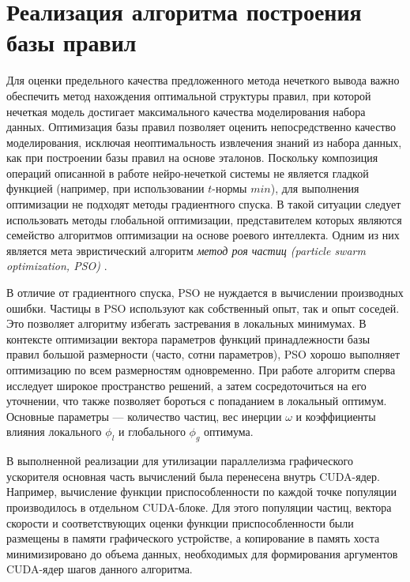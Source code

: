 
\section{Реализация алгоритма построения базы правил}

Для оценки предельного качества предложенного метода нечеткого вывода важно обеспечить метод нахождения оптимальной структуры правил, при которой нечеткая модель достигает максимального качества моделирования набора данных. Оптимизация базы правил позволяет оценить непосредственно качество моделирования, исключая неоптимальность извлечения знаний из набора данных, как при построении базы правил на основе эталонов. Поскольку композиция операций описанной в работе нейро-нечеткой системы не является гладкой функцией (например, при использовании $t$-нормы $min$), для выполнения оптимизации не подходят методы градиентного спуска. В такой ситуации следует использовать методы глобальной оптимизации, представителем которых являются семейство алгоритмов оптимизации на основе роевого интеллекта. Одним из них является мета эвристический алгоритм \textit{метод роя частиц (particle swarm optimization, PSO)} \cite{Kennedy1995}.

В отличие от градиентного спуска, PSO не нуждается в вычислении производных ошибки. Частицы в PSO используют как собственный опыт, так и опыт соседей. Это позволяет алгоритму избегать застревания в локальных минимумах. В контексте оптимизации вектора параметров функций принадлежности базы правил большой размерности (часто, сотни параметров), PSO хорошо выполняет оптимизацию по всем размерностям одновременно. При работе алгоритм сперва исследует широкое пространство решений, а затем сосредоточиться на его уточнении, что также позволяет бороться с попаданием в локальный оптимум. Основные параметры --- количество частиц, вес инерции $\omega$ и коэффициенты влияния локального $\phi_l$ и глобального $\phi_g$ оптимума. 

В выполненной реализации для утилизации параллелизма графического ускорителя основная часть вычислений была перенесена внутрь CUDA-ядер. Например, вычисление функции приспособленности по каждой точке популяции производилось в отдельном CUDA-блоке. Для этого популяции частиц, вектора скорости и соответствующих оценки функции приспособленности были размещены в памяти графического устройстве, а копирование в память хоста минимизировано до объема данных, необходимых для формирования аргументов CUDA-ядер шагов данного алгоритма.

